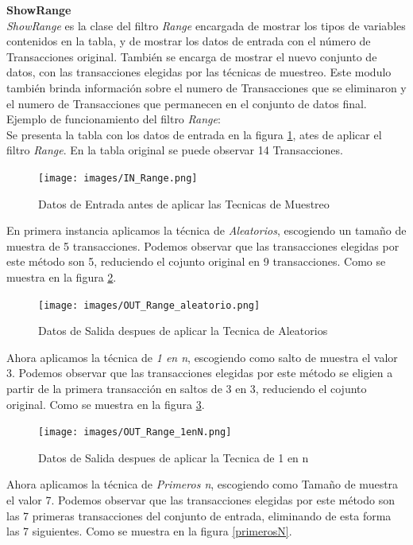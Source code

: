 \textbf{ShowRange} \\
\textit{ShowRange} es la clase del filtro \textit{Range} encargada de mostrar los tipos de variables contenidos en la tabla, y de mostrar los datos de entrada con el n\'umero de Transacciones original. Tambi\'en se encarga de mostrar el nuevo conjunto de datos, con las transacciones elegidas por las t\'ecnicas de muestreo. Este modulo tambi\'en brinda informaci\'on sobre el numero de Transacciones  que se eliminaron y el numero de Transacciones que permanecen en el conjunto de datos final.\\

Ejemplo de funcionamiento del filtro \textit{Range}: \\

Se presenta la tabla con los datos de entrada en la figura \ref{IN_Range}, ates de aplicar el filtro \textit{Range}.  En la tabla original se puede observar 14 Transacciones.

\begin{figure}[h]
\centering
\texttt{[image: images/IN\_Range.png]}
\caption{Datos de Entrada antes de aplicar las Tecnicas de Muestreo}
\label{IN_Range}
\end{figure}

En primera instancia aplicamos la t\'ecnica de  \textit{Aleatorios}, escogiendo un tama\~no de muestra de 5 transacciones. Podemos observar que las transacciones elegidas por este m\'etodo son 5, reduciendo el cojunto original en 9 transacciones. Como se muestra en la figura \ref{aleatorio}.

\begin{figure}[h]
\centering
\texttt{[image: images/OUT\_Range\_aleatorio.png]}
\caption{Datos de Salida despues de aplicar la Tecnica de Aleatorios}
\label{aleatorio}
\end{figure}

Ahora aplicamos la t\'ecnica de  \textit{1 en n}, escogiendo como salto de muestra el valor 3. Podemos observar que las transacciones elegidas por este m\'etodo se eligien a partir de la primera transacci\'on en saltos de 3 en 3, reduciendo el cojunto original. Como se muestra en la figura \ref{enN}.

\begin{figure}[h]
\centering
\texttt{[image: images/OUT\_Range\_1enN.png]}
\caption{Datos de Salida despues de aplicar la Tecnica de 1 en n}
\label{enN}
\end{figure}

Ahora aplicamos la t\'ecnica de \textit{Primeros n}, escogiendo como Tama\~no de muestra el valor 7. Podemos observar que las transacciones elegidas por este m\'etodo son las 7 primeras transacciones del conjunto de entrada, eliminando de esta forma las 7 siguientes. Como se muestra en la figura \ref{primerosN}.


